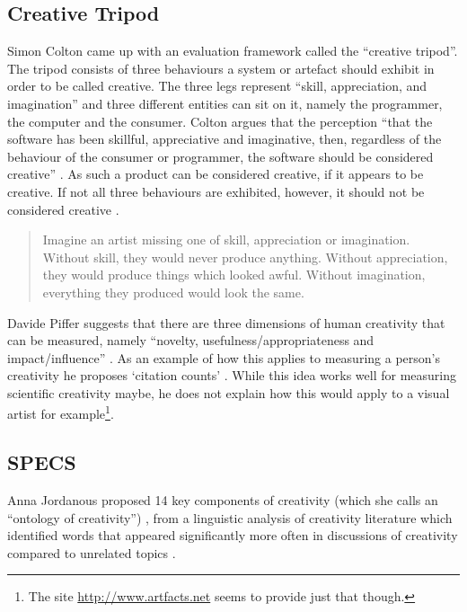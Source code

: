 \subsection{Creative Tripod}

Simon Colton came up with an evaluation framework called the ``creative tripod''. The tripod consists of three behaviours a system or artefact should exhibit in order to be called creative. The three legs represent ``skill, appreciation, and imagination'' and three different entities can sit on it, namely the programmer, the computer and the consumer. Colton argues that the perception ``that the software has been skillful, appreciative and imaginative, then, regardless of the behaviour of the consumer or programmer, the software should be considered creative'' \autocite*{Colton2008a, Colton2008}. As such a product can be considered creative, if it appears to be creative. If not all three behaviours are exhibited, however, it should not be considered creative \autocite{Colton2008a, Colton2008}.

\begin{quotation}
  Imagine an artist missing one of skill, appreciation or imagination. Without skill, they would never produce anything. Without appreciation, they would produce things which looked awful. Without imagination, everything they produced would look the same. 
\end{quotation}

\spirals

Davide Piffer suggests that there are three dimensions of human creativity that can be measured, namely ``novelty, usefulness/appropriateness and impact/influence'' \citeyear[p.258-259]{Piffer2012}. As an example of how this applies to measuring a person's creativity he proposes `citation counts' \autocite[p.261]{Piffer2012}. While this idea works well for measuring scientific creativity maybe, he does not explain how this would apply to a visual artist for example\footnote{The site \url{http://www.artfacts.net} seems to provide just that though.}.


\subsection{SPECS}
\label{s:specs}

Anna Jordanous proposed \num{14} key components of creativity (which she calls an ``ontology of creativity'') \citeyear[p.104-120]{Jordanous2012}, from a linguistic analysis of creativity literature which identified words that appeared significantly more often in discussions of creativity compared to unrelated topics \citeyear[p.120]{Jordanous2012}.

